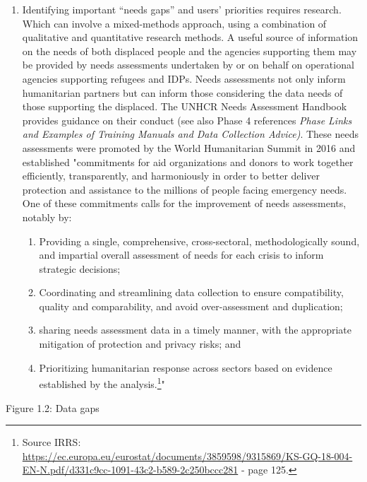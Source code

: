 \documentclass[
]{article}
\begin{document}
\begin{enumerate}
\def\labelenumi{\arabic{enumi}.}
\setcounter{enumi}{27}
\item
  Identifying important ``needs gaps'' and users' priorities requires
  research. Which can involve a mixed-methods approach, using a
  combination of qualitative and quantitative research methods. A
  useful source of information on the needs of both displaced people
  and the agencies supporting them may be provided by needs
  assessments undertaken by or on behalf on operational agencies
  supporting refugees and IDPs. Needs assessments not only inform
  humanitarian partners but can inform those considering the data
  needs of those supporting the displaced. The UNHCR Needs Assessment
  Handbook provides guidance on their conduct (see also Phase 4
  references \emph{Phase Links and Examples of Training Manuals and Data
  Collection Advice)}. These needs assessments were promoted by the
  World Humanitarian Summit in 2016 and established "commitments for
  aid organizations and donors to work together efficiently,
  transparently, and harmoniously in order to better deliver
  protection and assistance to the millions of people facing emergency
  needs. One of these commitments calls for the improvement of needs
  assessments, notably by:

  \begin{enumerate}
  \def\labelenumii{\arabic{enumii}.}
  \item
    Providing a single, comprehensive, cross-sectoral,
    methodologically sound, and impartial overall assessment of
    needs for each crisis to inform strategic decisions;
  \item
    Coordinating and streamlining data collection to ensure
    compatibility, quality and comparability, and avoid
    over-assessment and duplication;
  \item
    sharing needs assessment data in a timely manner, with the
    appropriate mitigation of protection and privacy risks; and
  \item
    Prioritizing humanitarian response across sectors based on
    evidence established by the analysis.\footnote{Source IRRS:
      \url{https://ec.europa.eu/eurostat/documents/3859598/9315869/KS-GQ-18-004-EN-N.pdf/d331c9cc-1091-43c2-b589-2c250bccc281}
      - page 125.}"
  \end{enumerate}
\end{enumerate}

Figure 1.2: Data gaps
\end{document}

